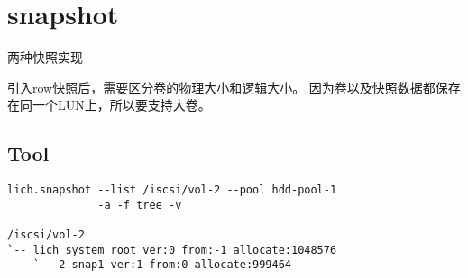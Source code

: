 \section{snapshot}

两种快照实现

引入row快照后，需要区分卷的物理大小和逻辑大小。
因为卷以及快照数据都保存在同一个LUN上，所以要支持大卷。

\subsection{Tool}

\begin{lstlisting}
lich.snapshot --list /iscsi/vol-2 --pool hdd-pool-1 
              -a -f tree -v

/iscsi/vol-2
`-- lich_system_root ver:0 from:-1 allocate:1048576
    `-- 2-snap1 ver:1 from:0 allocate:999464
\end{lstlisting}
